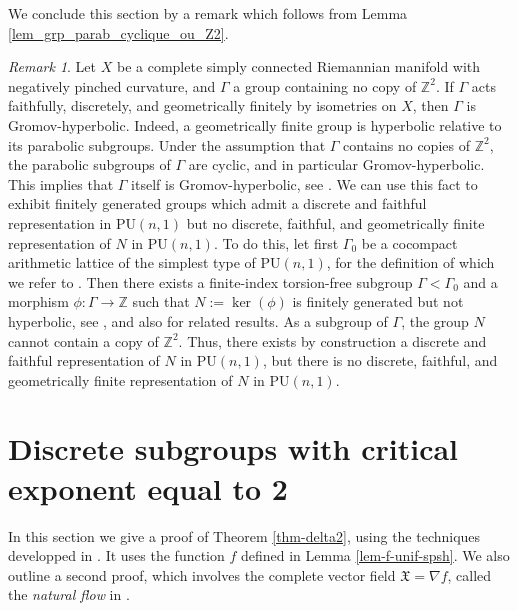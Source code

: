 \documentclass{article}
\theoremstyle{definition}
\theoremstyle{remark}
\newtheorem*{remark}{Remark}
\newcommand{\Z}{\mathbb{Z}}
\newcommand{\PU}{\mathrm{PU}}
\begin{document}
	We conclude this section by a remark which follows from Lemma \ref{lem_grp_parab_cyclique_ou_Z2}.
	\begin{remark}
		Let $X$ be a complete simply connected Riemannian manifold with negatively pinched curvature, and $\Gamma$ a group containing no copy of $\Z^{2}$. If $\Gamma$ acts faithfully, discretely, and geometrically finitely by isometries on $X$, then $\Gamma$ is Gromov-hyperbolic. Indeed, a geometrically finite group is hyperbolic relative to its parabolic subgroups. Under the assumption that $\Gamma$ contains no copies of $\Z^{2}$, the parabolic subgroups of $\Gamma$ are cyclic, and in particular Gromov-hyperbolic. This implies that $\Gamma$ itself is Gromov-hyperbolic, see \cite{osinRelativelyHyperbolicGroups2006}. We can use this fact to exhibit finitely generated groups which admit a discrete and faithful representation in $\PU(n,1)$ but no discrete, faithful, and geometrically finite representation of $N$ in $\PU(n,1)$. To do this, let first $\Gamma_0$ be a cocompact arithmetic lattice of the simplest type of $\PU(n,1)$, for the definition of which we refer to \cite[§VIII.5]{borelContinuousCohomologyDiscrete2000}. Then there exists a finite-index torsion-free subgroup $\Gamma<\Gamma_0$ and a morphism $\phi:\Gamma \to \Z$ such that $N:=\ker(\phi)$ is finitely generated but not hyperbolic, see \cite{llosaisenrichSubgroupsHyperbolicGroups2024}, and also \cite{italianoHyperbolic5manifoldsThat2023-manuel} for related results. As a subgroup of $\Gamma$, the group $N$ cannot contain a copy of $\Z^{2}$. Thus, there exists by construction a discrete and faithful representation of $N$ in $\PU(n,1)$, but there is no discrete, faithful, and geometrically finite representation of $N$ in $\PU(n,1)$.
	\end{remark}
	
	\section{Discrete subgroups with critical exponent equal to 2}\label{section-delta2}
	
	In this section we give a proof of Theorem \ref{thm-delta2}, using the techniques developped in \cite{connellNaturalFlowCritical2023}. It uses the function $f$ defined in Lemma \ref{lem-f-unif-spsh}. We also outline a second proof, which involves the complete vector field $\mathfrak{X}=\nabla{f}$, called the \textit{natural flow} in \cite{connellNaturalFlowCritical2023}.
	
\end{document}
